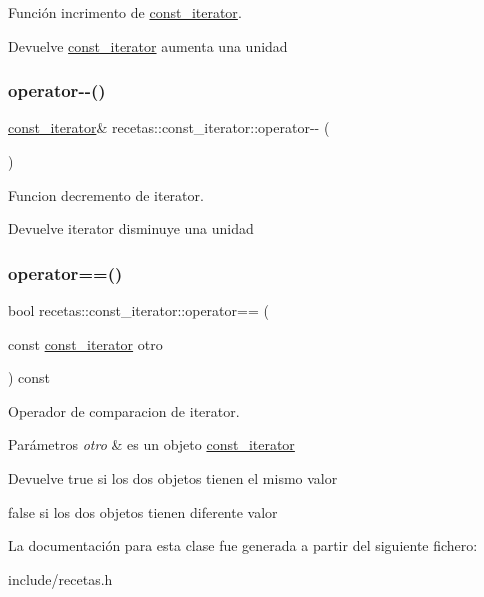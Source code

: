 Función incrimento de \hyperlink{classrecetas_1_1const__iterator}{const\+\_\+iterator}. 

\begin{DoxyReturn}{Devuelve}
\hyperlink{classrecetas_1_1const__iterator}{const\+\_\+iterator} aumenta una unidad 
\end{DoxyReturn}
\mbox{\label{classrecetas_1_1const__iterator_ad8735e8ae7237a13ccf62aa4cbf80c7b}} 
\subsubsection{\texorpdfstring{operator-\/-\/()}{operator--()}}
{\footnotesize\ttfamily \hyperlink{classrecetas_1_1const__iterator}{const\+\_\+iterator}\& recetas\+::const\+\_\+iterator\+::operator-\/-\/ (\begin{DoxyParamCaption}{ }\end{DoxyParamCaption})}



Funcion decremento de iterator. 

\begin{DoxyReturn}{Devuelve}
iterator disminuye una unidad 
\end{DoxyReturn}
\mbox{\label{classrecetas_1_1const__iterator_a9aabf80e22620aa6508b9690f554c05f}} 
\subsubsection{\texorpdfstring{operator==()}{operator==()}}
{\footnotesize\ttfamily bool recetas\+::const\+\_\+iterator\+::operator== (\begin{DoxyParamCaption}\item[{const \hyperlink{classrecetas_1_1const__iterator}{const\+\_\+iterator}}]{otro }\end{DoxyParamCaption}) const}



Operador de comparacion de iterator. 


\begin{DoxyParams}{Parámetros}
{\em otro} & es un objeto \hyperlink{classrecetas_1_1const__iterator}{const\+\_\+iterator} \\
\hline
\end{DoxyParams}
\begin{DoxyReturn}{Devuelve}
true si los dos objetos tienen el mismo valor 

false si los dos objetos tienen diferente valor 
\end{DoxyReturn}


La documentación para esta clase fue generada a partir del siguiente fichero\+:\begin{DoxyCompactItemize}
\item 
include/recetas.\+h\end{DoxyCompactItemize}
